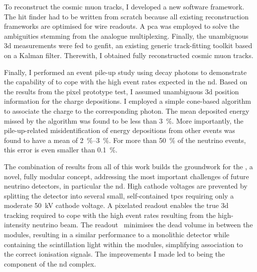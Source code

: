To reconstruct the cosmic muon tracks, I developed a new software framework.
The hit finder had to be written from scratch because all existing \lartpc{} reconstruction frameworks are optimised for wire readouts.
A \gls{pca} was employed to solve the ambiguities stemming from the analogue multiplexing.
Finally, the unambiguous \gls{3d} measurements were fed to \gls{genfit}, an existing generic track-fitting toolkit based on a Kalman filter.
Therewith, I obtained fully reconstructed cosmic muon tracks.

Finally, I performed an event pile-up study using \Pgpz decay photons to demonstrate the capability of \AC{} to cope with the high event rates expected in the \dune{} \gls{nd}.
Based on the results from the pixel prototype test, I assumed unambiguous \gls{3d} position information for the charge depositions.
I employed a simple cone-based algorithm to associate the charge to the corresponding photon.
The mean deposited energy missed by the algorithm was found to be less than \SI{3}{\percent}.
More importantly, the pile-up-related misidentification of energy depositions from other events was found to have a mean of \SIrange{2}{3}{\percent}.
For more than \SI{50}{\percent} of the neutrino events, this error is even smaller than \SI{0.1}{\percent}.

The combination of results from all of this work builds the groundwork for the \AC{}, a novel, fully modular \lartpc{} concept, addressing the most important challenges of future neutrino detectors, in particular the \dune{} \gls{nd}.
High cathode voltages are prevented by splitting the detector into several small, self-contained \glspl{tpc} requiring only a moderate \SI{50}{\kilo\volt} cathode voltage.
A pixelated readout enables the true \gls{3d} tracking required to cope with the high event rates resulting from the high-intensity neutrino beam.
The \AL{} readout~\cite{arclight} minimises the dead volume in between the modules, resulting in a similar performance to a monolithic detector while containing the scintillation light within the modules, simplifying association to the correct ionisation signals.
The improvements I made led to \AC{} being the \lar{} component of the \dune{} \gls{nd} complex.